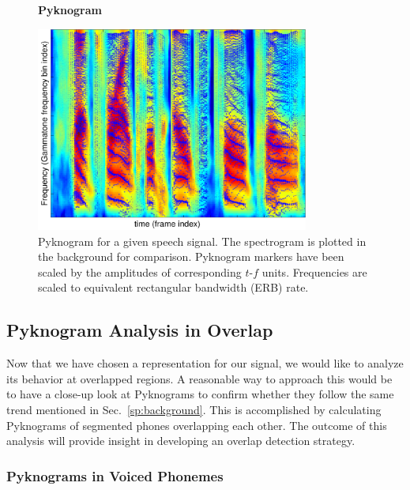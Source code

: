 {\begin{figure}[h!]
	\centering
	\vspace{4mm}
	\textbf{Pyknogram}\par\medskip
	\includegraphics[height =3.in, width=0.8\textwidth]{figures/pyknogram_vs_spectrogram}
	\vspace{-1mm}
	\caption{Pyknogram for a given speech signal. The spectrogram is plotted in the background for comparison. Pyknogram markers have been scaled by the amplitudes of corresponding $t$-$f$ units. Frequencies are scaled to equivalent rectangular bandwidth (ERB) rate.}
	\vspace{-1mm}
	\label{fig:pyknograms}
\end{figure}


\subsection{Pyknogram Analysis in Overlap}

Now that we have chosen a representation for our signal, we would like to analyze its behavior at overlapped regions. 
A reasonable way to approach this would be to have a close-up look at Pyknograms to confirm whether they follow the same trend mentioned in Sec.~\ref{sp:background}. 
This is accomplished by calculating Pyknograms of segmented phones overlapping each other. 
The outcome of this analysis will provide insight in developing an overlap detection strategy. 

\subsubsection{Pyknograms in Voiced Phonemes}

}
